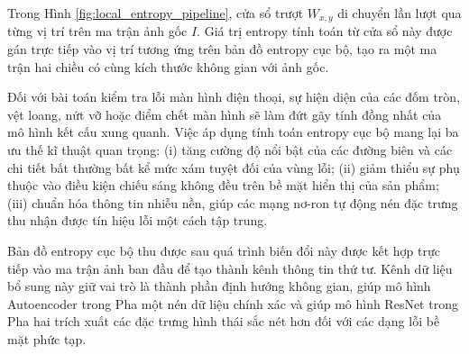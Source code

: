 Trong Hình \ref{fig:local_entropy_pipeline}, cửa sổ trượt $W_{x,y}$ di chuyển lần lượt qua từng vị trí trên ma trận ảnh gốc $I$. Giá trị entropy tính toán từ cửa sổ này được gán trực tiếp vào vị trí tương ứng trên bản đồ entropy cục bộ, tạo ra một ma trận hai chiều có cùng kích thước không gian với ảnh gốc.

Đối với bài toán kiểm tra lỗi màn hình điện thoại, sự hiện diện của các đốm tròn, vệt loang, nứt vỡ hoặc điểm chết màn hình sẽ làm đứt gãy tính đồng nhất của mô hình kết cấu xung quanh. Việc áp dụng tính toán entropy cục bộ mang lại ba ưu thế kĩ thuật quan trọng:
(i) tăng cường độ nổi bật của các đường biên và các chi tiết bất thường bất kể mức xám tuyệt đối của vùng lỗi;
(ii) giảm thiểu sự phụ thuộc vào điều kiện chiếu sáng không đều trên bề mặt hiển thị của sản phẩm;
(iii) chuẩn hóa thông tin nhiễu nền, giúp các mạng nơ-ron tự động nén đặc trưng thu nhận được tín hiệu lỗi một cách tập trung.

Bản đồ entropy cục bộ thu được sau quá trình biến đổi này được kết hợp trực tiếp vào ma trận ảnh ban đầu để tạo thành kênh thông tin thứ tư. Kênh dữ liệu bổ sung này giữ vai trò là thành phần định hướng không gian, giúp mô hình Autoencoder trong Pha một nén dữ liệu chính xác và giúp mô hình ResNet trong Pha hai trích xuất các đặc trưng hình thái sắc nét hơn đối với các dạng lỗi bề mặt phức tạp.